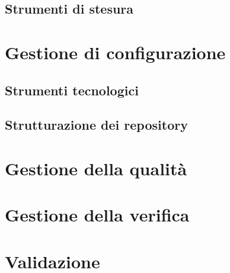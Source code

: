 \subsection{Strumenti di stesura}



\section{Gestione di configurazione}

\subsection{Strumenti tecnologici}
\subsection{Strutturazione dei repository}


\section{Gestione della qualità}
\section{Gestione della verifica}
\section{Validazione}